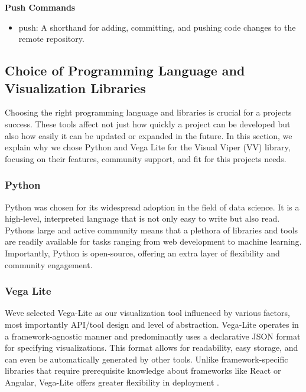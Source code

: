 \textbf{Push Commands}

\begin{itemize}
\item
  push: A shorthand for adding, committing, and pushing code changes to
  the remote repository.
\end{itemize}

\subsection{Choice of Programming Language and Visualization
Libraries}\label{choice-of-programming-language-and-visualization-libraries}

Choosing the right programming language and libraries is crucial for a
project\textquotesingle s success. These tools affect not just how
quickly a project can be developed but also how easily it can be updated
or expanded in the future. In this section, we explain why we chose
Python and Vega Lite for the Visual Viper (VV) library, focusing on
their features, community support, and fit for this
project\textquotesingle s needs.

\subsubsection{Python}\label{python}

Python was chosen for its widespread adoption in the field of data
science. It is a high-level, interpreted language that is not only easy
to write but also read. Python\textquotesingle s large and active
community means that a plethora of libraries and tools are readily
available for tasks ranging from web development to machine learning.
Importantly, Python is open-source, offering an extra layer of
flexibility and community engagement.

\subsubsection{Vega Lite}\label{vega-lite}

We\textquotesingle ve selected Vega-Lite as our visualization tool
influenced by various factors, most importantly API/tool design and
level of abstraction. Vega-Lite operates in a framework-agnostic manner
and predominantly uses a declarative JSON format for specifying
visualizations. This format allows for readability, easy storage, and
can even be automatically generated by other tools. Unlike
framework-specific libraries that require prerequisite knowledge about
frameworks like React or Angular, Vega-Lite offers greater flexibility
in deployment \cite{43}.

